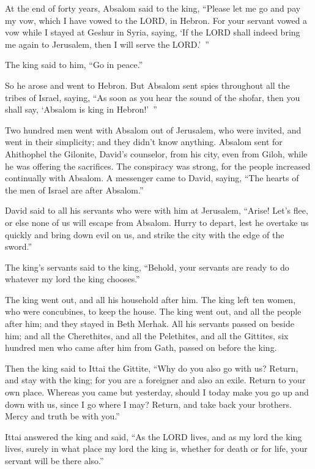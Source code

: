 \myverse{}At the end of forty years, Absalom said to the king, “Please let
me go and pay my vow, which I have vowed to the LORD, in Hebron.
\myverse{}For your servant vowed a vow while I stayed at Geshur in Syria, saying, ‘If
the LORD shall indeed bring me again to Jerusalem, then I will serve the LORD.’ ”

\myverse{}The king said to him, “Go in peace.”

So he arose and went to Hebron.
\myverse{}But Absalom sent spies throughout all the tribes of Israel, saying, “As soon
as you hear the sound of the shofar, then you shall say, ‘Absalom is king in Hebron!’ ”

\myverse{}Two hundred men went with Absalom out of Jerusalem, who were
invited, and went in their simplicity; and they didn’t know anything.
\myverse{}Absalom sent for Ahithophel the Gilonite, David’s counselor, from his city,
even from Giloh, while he was offering the sacrifices. The conspiracy was strong, for the people increased
continually with Absalom.
\myverse{}A messenger came to David, saying, “The hearts of the men of Israel are after
Absalom.”

\myverse{}David said to all his servants who were with him at Jerusalem,
“Arise! Let’s flee, or else none of us will escape from Absalom. Hurry to depart, lest he overtake us
quickly and bring down evil on us, and strike the city with the edge of the sword.”

\myverse{}The king’s servants said to the king, “Behold, your servants
are ready to do whatever my lord the king chooses.”

\myverse{}The king went out, and all his household after him. The king
left ten women, who were concubines, to keep the house.
\myverse{}The king went out, and all the people after him; and they stayed in Beth
Merhak.
\myverse{}All his servants passed on beside him; and all the Cherethites, and all the
Pelethites, and all the Gittites, six hundred men who came after him from Gath, passed on before the king.

\myverse{}Then the king said to Ittai the Gittite, “Why do you also go
with us? Return, and stay with the king; for you are a foreigner and also an exile. Return to your own
place.
\myverse{}Whereas you came but yesterday, should I today make you go up and down with
us, since I go where I may? Return, and take back your brothers. Mercy and truth be with you.”

\myverse{}Ittai answered the king and said, “As the LORD lives, and as
my lord the king lives, surely in what place my lord the king is, whether for death or for life, your
servant will be there also.”

